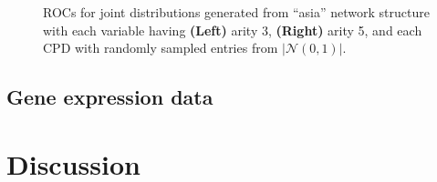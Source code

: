 \documentclass{article} %
\begin{document}
\begin{figure}[h]
\centering
    \quad
\caption{ROCs for joint distributions generated from ``asia'' network structure with each variable having {\bf (Left)} arity 3, {\bf (Right)} arity 5, and each CPD with randomly sampled entries from $|\mathcal{N}(0, 1)|$.}
\label{fig:asia_random}
\end{figure}

\subsection{Gene expression data}

\section{Discussion}

\begin{small}

%
%

\end{small}

%
\end{document}
